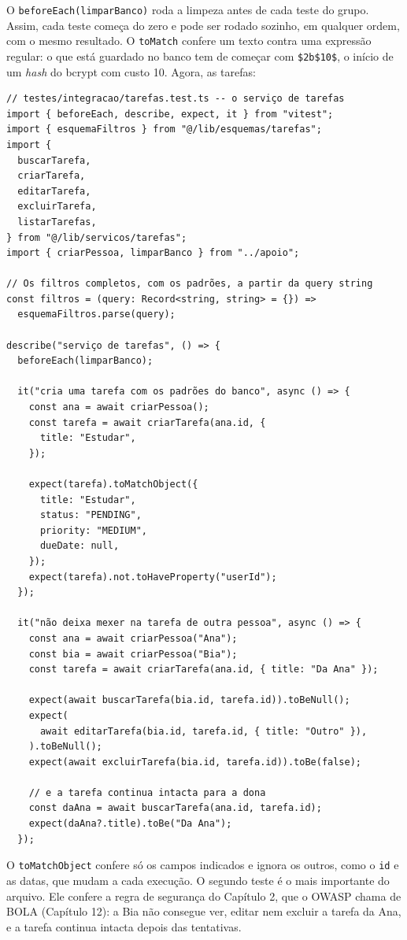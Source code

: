 O \texttt{beforeEach(limparBanco)} roda a limpeza antes de cada teste do grupo. Assim, cada teste começa do zero e pode ser rodado sozinho, em qualquer ordem, com o mesmo resultado. O \texttt{toMatch} confere um texto contra uma expressão regular: o que está guardado no banco tem de começar com \texttt{\$2b\$10\$}, o início de um \textit{hash} do bcrypt com custo 10. Agora, as tarefas:

\begin{codigo}
\begin{Verbatim}[breaklines=true, breaksymbolleft={}, fontsize=\footnotesize]
// testes/integracao/tarefas.test.ts -- o serviço de tarefas
import { beforeEach, describe, expect, it } from "vitest";
import { esquemaFiltros } from "@/lib/esquemas/tarefas";
import {
  buscarTarefa,
  criarTarefa,
  editarTarefa,
  excluirTarefa,
  listarTarefas,
} from "@/lib/servicos/tarefas";
import { criarPessoa, limparBanco } from "../apoio";

// Os filtros completos, com os padrões, a partir da query string
const filtros = (query: Record<string, string> = {}) =>
  esquemaFiltros.parse(query);

describe("serviço de tarefas", () => {
  beforeEach(limparBanco);

  it("cria uma tarefa com os padrões do banco", async () => {
    const ana = await criarPessoa();
    const tarefa = await criarTarefa(ana.id, {
      title: "Estudar",
    });

    expect(tarefa).toMatchObject({
      title: "Estudar",
      status: "PENDING",
      priority: "MEDIUM",
      dueDate: null,
    });
    expect(tarefa).not.toHaveProperty("userId");
  });

  it("não deixa mexer na tarefa de outra pessoa", async () => {
    const ana = await criarPessoa("Ana");
    const bia = await criarPessoa("Bia");
    const tarefa = await criarTarefa(ana.id, { title: "Da Ana" });

    expect(await buscarTarefa(bia.id, tarefa.id)).toBeNull();
    expect(
      await editarTarefa(bia.id, tarefa.id, { title: "Outro" }),
    ).toBeNull();
    expect(await excluirTarefa(bia.id, tarefa.id)).toBe(false);

    // e a tarefa continua intacta para a dona
    const daAna = await buscarTarefa(ana.id, tarefa.id);
    expect(daAna?.title).toBe("Da Ana");
  });
\end{Verbatim}
\end{codigo}

O \texttt{toMatchObject} confere só os campos indicados e ignora os outros, como o \texttt{id} e as datas, que mudam a cada execução. O segundo teste é o mais importante do arquivo. Ele confere a regra de segurança do Capítulo 2, que o OWASP chama de BOLA (Capítulo 12): a Bia não consegue ver, editar nem excluir a tarefa da Ana, e a tarefa continua intacta depois das tentativas.

